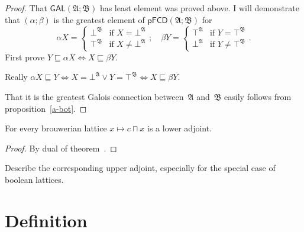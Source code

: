 \begin{proof}
That $\mathsf{GAL} (\mathfrak{A}; \mathfrak{B})$ has least element was proved
above. I will demonstrate that $(\alpha ; \beta)$
is the greatest element of $\mathsf{pFCD} (\mathfrak{A}; \mathfrak{B})$ for
\[ \alpha X = \begin{cases}
     \bot^{\mathfrak{B}} & \text{if } X = \bot^{\mathfrak{A}}\\
     \top^{\mathfrak{B}} & \text{if } X \neq \bot^{\mathfrak{A}}
   \end{cases} ; \quad
   \beta Y = \begin{cases}
     \top^{\mathfrak{A}} & \text{if } Y = \top^{\mathfrak{B}}\\
     \bot^{\mathfrak{A}} & \text{if } Y \neq \top^{\mathfrak{B}}
   \end{cases} . \]
First prove $Y \sqsubseteq \alpha X \Leftrightarrow X \sqsubseteq \beta Y$.

Really $\alpha X\sqsubseteq Y \Leftrightarrow X=\bot^{\mathfrak{A}}\lor Y=\top^{\mathfrak{B}} \Leftrightarrow X \sqsubseteq \beta Y$.

That it is the greatest Galois connection between~$\mathfrak{A}$ and~$\mathfrak{B}$ easily follows from proposition~\ref{a-bot}.
\end{proof}

\begin{thm}
  For every brouwerian lattice $x \mapsto c \sqcap x$ is a lower adjoint.
\end{thm}

\begin{proof}
  By dual of theorem~.
\end{proof}

\begin{xca}
  Describe the corresponding upper adjoint, especially for the special case of
  boolean lattices.
\end{xca}

\section{Definition}

